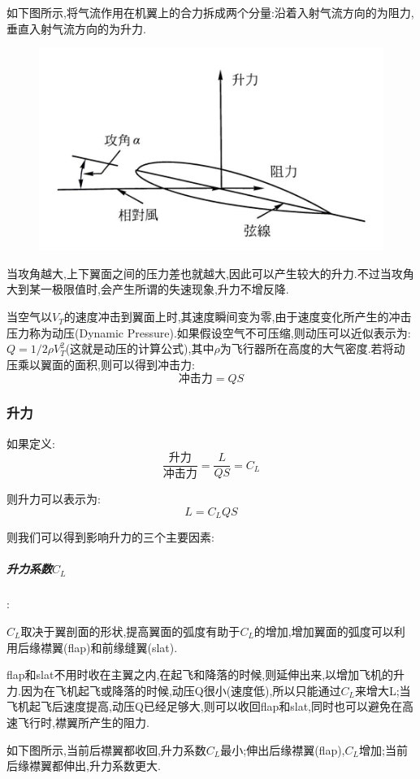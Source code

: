 \documentclass[9pt, oneside]{book}
\begin{document}
如下图所示,将气流作用在机翼上的合力拆成两个分量:沿着入射气流方向的为阻力,垂直入射气流方向的为升力.
\begin{figure}[H]
    \centering
    \includegraphics[width=0.5\linewidth]{image/2-15.jpg}
\end{figure}

当攻角越大,上下翼面之间的压力差也就越大,因此可以产生较大的升力.不过当攻角大到某一极限值时,会产生所谓的失速现象,升力不增反降.

当空气以$V_T$的速度冲击到翼面上时,其速度瞬间变为零,由于速度变化所产生的冲击压力称为动压(Dynamic Pressure).如果假设空气不可压缩,则动压可以近似表示为:$Q = 1/2\rho V_T^2$(这就是动压的计算公式),其中$\rho$为飞行器所在高度的大气密度.若将动压乘以翼面的面积,则可以得到冲击力:
\begin{equation}
    \mbox{冲击力} = QS
\end{equation}
    
\subsubsection{升力}

如果定义:
\begin{equation}
    \frac{\mbox{升力}}{\mbox{冲击力}} = \frac{L}{QS} = C_L
\end{equation}

则升力可以表示为:
\begin{equation}
    L = C_LQS
\end{equation}

则我们可以得到影响升力的三个主要因素:

\subparagraph{升力系数$C_L$}:

$C_L$取决于翼剖面的形状,提高翼面的弧度有助于$C_L$的增加,增加翼面的弧度可以利用后缘襟翼(flap)和前缘缝翼(slat).

flap和slat不用时收在主翼之内,在起飞和降落的时候,则延伸出来,以增加飞机的升力.因为在飞机起飞或降落的时候,动压Q很小(速度低),所以只能通过$C_L$来增大L;当飞机起飞后速度提高,动压Q已经足够大,则可以收回flap和slat,同时也可以避免在高速飞行时,襟翼所产生的阻力.

如下图所示,当前后襟翼都收回,升力系数$C_L$最小;伸出后缘襟翼(flap),$C_L$增加;当前后缘襟翼都伸出,升力系数更大.
\end{document}
